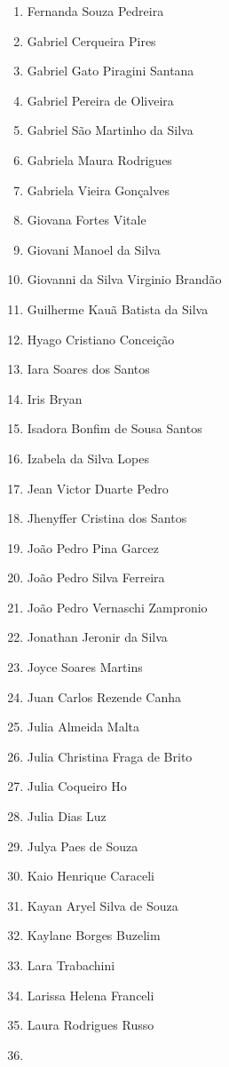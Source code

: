 \documentclass[
  letterpaper,
  DIV=11,
  numbers=noendperiod]{scrreprt}
\begin{document}
\begin{enumerate}
  Felipe Vieira Conway Baccarat
\item
  Fernanda Souza Pedreira
\item
  Gabriel Cerqueira Pires
\item
  Gabriel Gato Piragini Santana
\item
  Gabriel Pereira de Oliveira
\item
  Gabriel São Martinho da Silva
\item
  Gabriela Maura Rodrigues
\item
  Gabriela Vieira Gonçalves
\item
  Giovana Fortes Vitale
\item
  Giovani Manoel da Silva
\item
  Giovanni da Silva Virginio Brandão
\item
  Guilherme Kauã Batista da Silva
\item
  Hyago Cristiano Conceição
\item
  Iara Soares dos Santos
\item
  Iris Bryan
\item
  Isadora Bonfim de Sousa Santos
\item
  Izabela da Silva Lopes
\item
  Jean Victor Duarte Pedro
\item
  Jhenyffer Cristina dos Santos
\item
  João Pedro Pina Garcez
\item
  João Pedro Silva Ferreira
\item
  João Pedro Vernaschi Zampronio
\item
  Jonathan Jeronir da Silva
\item
  Joyce Soares Martins
\item
  Juan Carlos Rezende Canha
\item
  Julia Almeida Malta
\item
  Julia Christina Fraga de Brito
\item
  Julia Coqueiro Ho
\item
  Julia Dias Luz
\item
  Julya Paes de Souza
\item
  Kaio Henrique Caraceli
\item
  Kayan Aryel Silva de Souza
\item
  Kaylane Borges Buzelim
\item
  Lara Trabachini
\item
  Larissa Helena Franceli
\item
  Laura Rodrigues Russo
\item

\end{enumerate}
\end{document}
